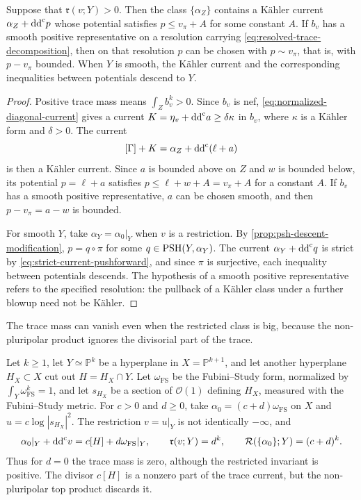 \begin{proposition}\label{prop:resolved-trace-strict-current}
Suppose that $\mathfrak r(v;Y)>0$. Then the class $\{\alpha_Z\}$ contains a K\"ahler current $\alpha_Z+\mathrm{dd}^{\mathrm{c}} p$ whose potential satisfies $p\leq v_\pi+A$ for some constant $A$. If $b_v$ has a smooth positive representative on a resolution carrying \eqref{eq:resolved-trace-decomposition}, then on that resolution $p$ can be chosen with $p\sim v_\pi$, that is, with $p-v_\pi$ bounded. When $Y$ is smooth, the K\"ahler current and the corresponding inequalities between potentials descend to $Y$.
\end{proposition}
\begin{proof}
Positive trace mass means $\int_Zb_v^k>0$. Since $b_v$ is nef, \eqref{eq:normalized-diagonal-current} gives a current $K=\eta_v+\mathrm{dd}^{\mathrm{c}} a\geq\delta\kappa$ in $b_v$, where $\kappa$ is a K\"ahler form and $\delta>0$. The current
\[
 [\Gamma]+K=\alpha_Z+\mathrm{dd}^{\mathrm{c}}(\ell+a)
\]
is then a K\"ahler current. Since $a$ is bounded above on $Z$ and $w$ is bounded below, its potential $p=\ell+a$ satisfies $p\leq\ell+w+A=v_\pi+A$ for a constant $A$. If $b_v$ has a smooth positive representative, $a$ can be chosen smooth, and then $p-v_\pi=a-w$ is bounded.

For smooth $Y$, take $\alpha_Y=\alpha_0|_Y$ when $v$ is a restriction. By \cref{prop:psh-descent-modification}, $p=q\circ\pi$ for some $q\in\mathrm{PSH}(Y,\alpha_Y)$. The current $\alpha_Y+\mathrm{dd}^{\mathrm{c}} q$ is strict by \eqref{eq:strict-current-pushforward}, and since $\pi$ is surjective, each inequality between potentials descends. The hypothesis of a smooth positive representative refers to the specified resolution: the pullback of a K\"ahler class under a further blowup need not be K\"ahler.
\end{proof}

The trace mass can vanish even when the restricted class is big, because the non-pluripolar product ignores the divisorial part of the trace.

\begin{example}\label{ex:divisorial-trace-zero-mass}
Let $k\geq1$, let $Y\simeq\mathbb P^k$ be a hyperplane in $X=\mathbb P^{k+1}$, and let another hyperplane $H_X\subset X$ cut out $H=H_X\cap Y$. Let $\omega_{\mathrm{FS}}$ be the Fubini--Study form, normalized by $\int_Y\omega_{\mathrm{FS}}^k=1$, and let $s_{H_X}$ be a section of $\mathcal O(1)$ defining $H_X$, measured with the Fubini--Study metric. For $c>0$ and $d\geq0$, take $\alpha_0=(c+d)\omega_{\mathrm{FS}}$ on $X$ and $u=c\log|s_{H_X}|^2$. The restriction $v=u|_Y$ is not identically $-\infty$, and
\[
 \alpha_0|_Y+\mathrm{dd}^{\mathrm{c}} v=c[H]+d\omega_{\mathrm{FS}}|_Y,
 \qquad \mathfrak r(v;Y)=d^k,
 \qquad \mathcal R(\{\alpha_0\};Y)=(c+d)^k.
\]
Thus for $d=0$ the trace mass is zero, although the restricted invariant is positive. The divisor $c[H]$ is a nonzero part of the trace current, but the non-pluripolar top product discards it.
\end{example}

